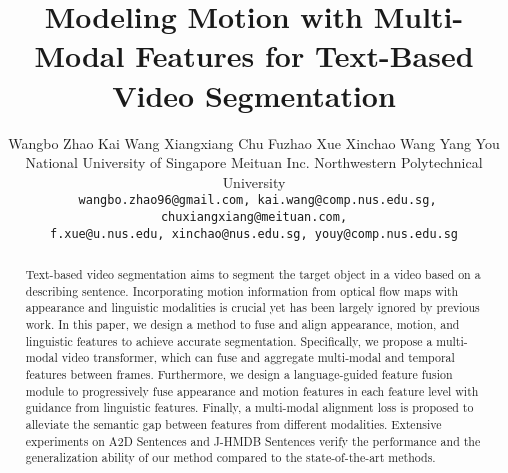 \documentclass[10pt,twocolumn,letterpaper]{article}
\begin{document}
\title{Modeling Motion with Multi-Modal Features for Text-Based Video Segmentation}

\author{Wangbo Zhao\quad 
Kai Wang\quad
Xiangxiang Chu\quad
Fuzhao Xue\quad
Xinchao Wang\quad
Yang You\footnotemark[1]\quad\\
 National University of Singapore \quad
 Meituan Inc. \quad
 Northwestern Polytechnical University \\
 {\tt\small
wangbo.zhao96@gmail.com, kai.wang@comp.nus.edu.sg, chuxiangxiang@meituan.com,}\\
{\tt\small f.xue@u.nus.edu, xinchao@nus.edu.sg, youy@comp.nus.edu.sg}}


\maketitle
{}

\vspace{-0.1cm}
\begin{abstract} 
Text-based video segmentation aims to segment the target object in a video based on a describing sentence. Incorporating motion information from optical flow maps with appearance and linguistic modalities is crucial yet has been largely ignored by previous work. In this paper, we design a method to fuse and align appearance, motion, and linguistic features to achieve accurate segmentation. Specifically, we propose a multi-modal video transformer, which can fuse and aggregate multi-modal and temporal features between frames. Furthermore, we design a language-guided feature fusion module to progressively fuse appearance and motion features in each feature level with guidance from linguistic features. Finally, a multi-modal alignment loss is proposed to alleviate the semantic gap between features from different modalities. Extensive experiments on A2D Sentences and J-HMDB Sentences verify the performance and the generalization ability of our method compared to the state-of-the-art methods.
\end{abstract}




\vspace{-6mm}  
\end{document}
